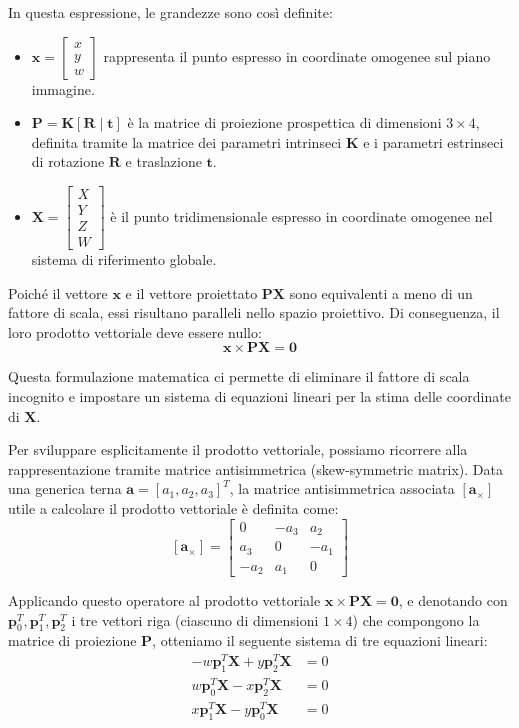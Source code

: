 ﻿\documentclass[11pt, a4paper]{article}
\begin{document}
In questa espressione, le grandezze sono così definite:
\begin{itemize}
    \item $\bm{x} = \begin{bmatrix} x \\ y \\ w \end{bmatrix}$ rappresenta il punto espresso in coordinate omogenee sul piano immagine.
    \item $\bm{P} = \bm{K}[\bm{R} \mid \bm{t}]$ è la matrice di proiezione prospettica di dimensioni $3 \times 4$, definita tramite la matrice dei parametri intrinseci $\bm{K}$ e i parametri estrinseci di rotazione $\bm{R}$ e traslazione $\bm{t}$.
    \item $\bm{X} = \begin{bmatrix} X \\ Y \\ Z \\ W \end{bmatrix}$ è il punto tridimensionale espresso in coordinate omogenee nel sistema di riferimento globale.
\end{itemize}

Poiché il vettore $\bm{x}$ e il vettore proiettato $\bm{P}\bm{X}$ sono equivalenti a meno di un fattore di scala, essi risultano paralleli nello spazio proiettivo. Di conseguenza, il loro prodotto vettoriale deve essere nullo:
\[ \bm{x} \times \bm{P}\bm{X} = \bm{0} \]

Questa formulazione matematica ci permette di eliminare il fattore di scala incognito e impostare un sistema di equazioni lineari per la stima delle coordinate di $\bm{X}$.

Per sviluppare esplicitamente il prodotto vettoriale, possiamo ricorrere alla rappresentazione tramite matrice antisimmetrica (skew-symmetric matrix). Data una generica terna $\bm{a} = [a_1, a_2, a_3]^T$, la matrice antisimmetrica associata $[\bm{a}_{\times}]$ utile a calcolare il prodotto vettoriale è definita come:
\[ [\bm{a}_{\times}] = \begin{bmatrix} 0 & -a_3 & a_2 \\ a_3 & 0 & -a_1 \\ -a_2 & a_1 & 0 \end{bmatrix} \]

Applicando questo operatore al prodotto vettoriale $\bm{x} \times \bm{P}\bm{X} = \bm{0}$, e denotando con $\bm{p}_0^T, \bm{p}_1^T, \bm{p}_2^T$ i tre vettori riga (ciascuno di dimensioni $1 \times 4$) che compongono la matrice di proiezione $\bm{P}$, otteniamo il seguente sistema di tre equazioni lineari:
\begin{align*}
-w \bm{p}_1^T \bm{X} + y \bm{p}_2^T \bm{X} &= 0 \\
w \bm{p}_0^T \bm{X} - x \bm{p}_2^T \bm{X} &= 0 \\
x \bm{p}_1^T \bm{X} - y \bm{p}_0^T \bm{X} &= 0
\end{align*}
\end{document}
